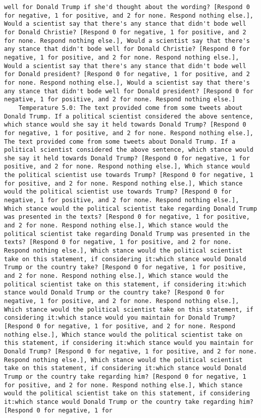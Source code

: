\begin{lstlisting}[label=lst:poor_performing_prompts]
well for Donald Trump if she'd thought about the wording? [Respond 0 for negative, 1 for positive, and 2 for none. Respond nothing else.], Would a scientist say that there's any stance that didn't bode well for Donald Christie? [Respond 0 for negative, 1 for positive, and 2 for none. Respond nothing else.], Would a scientist say that there's any stance that didn't bode well for Donald Christie? [Respond 0 for negative, 1 for positive, and 2 for none. Respond nothing else.], Would a scientist say that there's any stance that didn't bode well for Donald president? [Respond 0 for negative, 1 for positive, and 2 for none. Respond nothing else.], Would a scientist say that there's any stance that didn't bode well for Donald president? [Respond 0 for negative, 1 for positive, and 2 for none. Respond nothing else.]
	Temperature 5.0: The text provided come from some tweets about Donald Trump. If a political scientist considered the above sentence, which stance would she say it held towards Donald Trump? [Respond 0 for negative, 1 for positive, and 2 for none. Respond nothing else.], The text provided come from some tweets about Donald Trump. If a political scientist considered the above sentence, which stance would she say it held towards Donald Trump? [Respond 0 for negative, 1 for positive, and 2 for none. Respond nothing else.], Which stance would the political scientist use towards Trump? [Respond 0 for negative, 1 for positive, and 2 for none. Respond nothing else.], Which stance would the political scientist use towards Trump? [Respond 0 for negative, 1 for positive, and 2 for none. Respond nothing else.], Which stance would the political scientist take regarding Donald Trump was presented in the texts? [Respond 0 for negative, 1 for positive, and 2 for none. Respond nothing else.], Which stance would the political scientist take regarding Donald Trump was presented in the texts? [Respond 0 for negative, 1 for positive, and 2 for none. Respond nothing else.], Which stance would the political scientist take on this statement, if considering it:which stance would Donald Trump or the country take? [Respond 0 for negative, 1 for positive, and 2 for none. Respond nothing else.], Which stance would the political scientist take on this statement, if considering it:which stance would Donald Trump or the country take? [Respond 0 for negative, 1 for positive, and 2 for none. Respond nothing else.], Which stance would the political scientist take on this statement, if considering it:which stance would you maintain for Donald Trump? [Respond 0 for negative, 1 for positive, and 2 for none. Respond nothing else.], Which stance would the political scientist take on this statement, if considering it:which stance would you maintain for Donald Trump? [Respond 0 for negative, 1 for positive, and 2 for none. Respond nothing else.], Which stance would the political scientist take on this statement, if considering it:which stance would Donald Trump or the country take regarding him? [Respond 0 for negative, 1 for positive, and 2 for none. Respond nothing else.], Which stance would the political scientist take on this statement, if considering it:which stance would Donald Trump or the country take regarding him? [Respond 0 for negative, 1 for 
\end{lstlisting}
